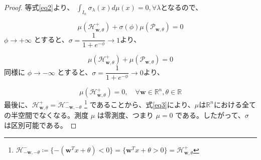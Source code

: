 \documentclass[a4paper]{jsarticle}%
\begin{document}
\begin{prop}
\begin{proof}
等式\eqref{eq2}より、 $\int_{I_n} \sigma_\lambda(x) d\mu(x)=0,\forall \lambda $となるので、

\[
\mu(\mathcal{H}^+_{\mathbf{w},\theta}) + \sigma(\phi)\mu(\mathcal{P}_{\mathbf{w},\theta}) = 0
\]
$\phi \to +\infty$ とすると、$\sigma = \dfrac{1}{1+e^{-\phi}}\to 1$より、

\[
\mu(\mathcal{H}^+_{\mathbf{w},\theta}) + \mu(\mathcal{P}_{\mathbf{w},\theta}) = 0
\]
同様に $\phi \to -\infty$ とすると、$\sigma = \dfrac{1}{1+e^{-\phi}}\to 0$より、

\begin{equation}
  \mu(\mathcal{H}^+_{\mathbf{w},\theta}) = 0, \quad \forall \mathbf{w} \in \mathbb{R}^n, \theta \in \mathbb{R}\label{eq3}
\end{equation}
最後に、$\mathcal{H}^+_{\mathbf{w},\theta} = \mathcal{H}^-_{-\mathbf{w},-\theta}$ \footnote{$\mathcal{H}^-_{-\mathbf{w},-\theta}\coloneq \{-(\mathbf{w}^T x+\theta)<0\} =\{\mathbf{w}^T x+\theta >0\}=\mathcal{H}^+_{\mathbf{w},\theta}$}
であることから、式\eqref{eq3}により、$\mu$は$\mathbb{R}^n$における全ての半空間でなくなる。測度 $\mu$ は零測度、つまり $\mu = 0$ である。したがって、$\sigma$ は区別可能である。
\end{proof} 
\end{prop}
\appendix



\end{document}
